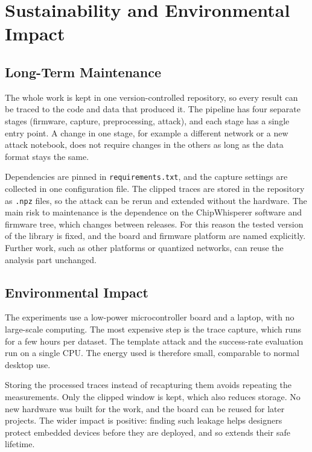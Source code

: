 \chapter{Sustainability and Environmental Impact}
\label{chap:sustainability}

\section{Long-Term Maintenance}

The whole work is kept in one version-controlled repository, so every result can be traced to the code and data that produced it.
The pipeline has four separate stages (firmware, capture, preprocessing, attack), and each stage has a single entry point.
A change in one stage, for example a different network or a new attack notebook, does not require changes in the others as long as the data format stays the same.

Dependencies are pinned in \texttt{requirements.txt}, and the capture settings are collected in one configuration file.
The clipped traces are stored in the repository as \texttt{.npz} files, so the attack can be rerun and extended without the hardware.
The main risk to maintenance is the dependence on the ChipWhisperer software and firmware tree, which changes between releases.
For this reason the tested version of the library is fixed, and the board and firmware platform are named explicitly.
Further work, such as other platforms or quantized networks, can reuse the analysis part unchanged.

\section{Environmental Impact}

The experiments use a low-power microcontroller board and a laptop, with no large-scale computing.
The most expensive step is the trace capture, which runs for a few hours per dataset.
The template attack and the success-rate evaluation run on a single CPU.
The energy used is therefore small, comparable to normal desktop use.

Storing the processed traces instead of recapturing them avoids repeating the measurements.
Only the clipped window is kept, which also reduces storage.
No new hardware was built for the work, and the board can be reused for later projects.
The wider impact is positive: finding such leakage helps designers protect embedded devices before they are deployed, and so extends their safe lifetime.
